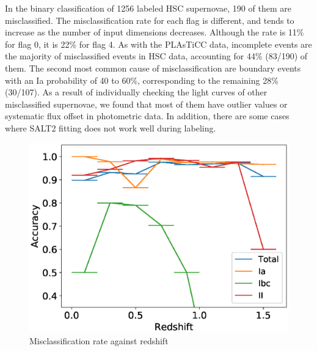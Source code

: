 \documentclass[useamsfonts]{pasj01}
\begin{document}
In the binary classification of 1256 labeled HSC supernovae, 190 of them are misclassified.
The misclassification rate for each flag is different, and tends to increase as the number of input dimensions decreases.
Although the rate is 11\% for flag 0, it is 22\% for flag 4.
As with the PLAsTiCC data, incomplete events are the majority of misclassified events in HSC data, accounting for 44\% (83/190) of them.
The second most common cause of misclassification are boundary events with an Ia probability of 40 to 60\%, corresponding to the remaining 28\% (30/107).
As a result of individually checking the light curves of other misclassified supernovae, we found that most of them have outlier values or systematic flux offset in photometric data.
In addition, there are some cases where SALT2 fitting does not work well during labeling.
%
\begin{figure}[ht]
  \begin{center}
     \includegraphics[width=\columnwidth]{figures/misclass_rate_plastic_3class.eps}
  \end{center}
  \caption{%
  Misclassification rate against redshift
  }%
  \label{fig:misclass_rate_3class}
\end{figure}
%
%
\end{document}
